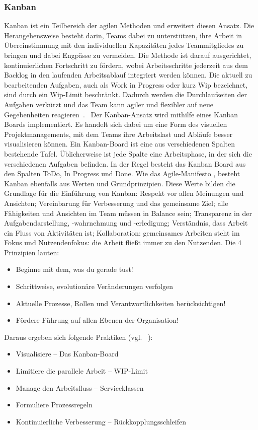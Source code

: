 \documentclass[sigconf, nonacm]{acmart}
\begin{document}
\subsubsection{Kanban}
Kanban ist ein Teilbereich der agilen Methoden und erweitert diesen Ansatz. Die Herangehensweise besteht darin, Teams dabei zu unterstützen, ihre Arbeit in Übereinstimmung mit den individuellen Kapazitäten jedes Teammitgliedes zu bringen und dabei Engpässe zu vermeiden. Die Methode ist darauf ausgerichtet, kontinuierlichen Fortschritt zu fördern, wobei Arbeitsschritte jederzeit aus dem Backlog in den laufenden Arbeitsablauf integriert werden können.
Die aktuell zu bearbeitenden Aufgaben, auch als Work in Progress oder kurz Wip bezeichnet, sind durch ein Wip-Limit beschränkt. Dadurch werden die Durchlaufseiten der Aufgaben verkürzt und das Team kann agiler und flexibler auf neue Gegebenheiten reagieren~\cite{asana_kanban_13_4_23}.
\
Der Kanban-Ansatz wird mithilfe eines Kanban Boards implementiert. Es handelt sich dabei um eine Form des visuellen Projektmanagements, mit dem Teams ihre Arbeitslast und Abläufe besser visualisieren können. Ein Kanban-Board ist eine aus verschiedenen Spalten bestehende Tafel. Üblicherweise ist jede Spalte eine Arbeitsphase, in der sich die verschiedenen Aufgaben befinden. In der Regel besteht das Kanban Board aus den Spalten ToDo, In Progress und Done.
Wie das Agile-Manifesto \cite{beck2001agile}, besteht Kanban ebenfalls aus Werten und Grundprinzipien.
Diese Werte bilden die Grundlage für die Einführung von Kanban: Respekt vor allen Meinungen und Ansichten; Vereinbarung für Verbesserung und das gemeinsame Ziel; alle Fähigkeiten und Ansichten im Team müssen in Balance sein; Transparenz in der Aufgabendarstellung, -wahrnehmung und -erledigung; Verständnis, dass Arbeit ein Fluss von Aktivitäten ist; Kollaboration: gemeinsames Arbeiten steht im Fokus und Nutzendenfokus: die Arbeit fließt immer zu den Nutzenden.
Die 4 Prinzipien lauten:
\begin{itemize}
    \item  Beginne mit dem, was du gerade tust!
    \item Schrittweise, evolutionäre Veränderungen verfolgen
    \item Aktuelle Prozesse, Rollen und Verantwortlichkeiten berücksichtigen!
    \item Fördere Führung auf allen Ebenen der Organisation!
\end{itemize}
Daraus ergeben sich folgende Praktiken (vgl. ~\cite{noauthor_organisationshandbuch_nodate}):
\begin{itemize}
\item Visualisiere – Das Kanban-Board
\item Limitiere die parallele Arbeit – WIP-Limit
\item Manage den Arbeitsfluss – Serviceklassen
\item Formuliere Prozessregeln
\item Kontinuierliche Verbesserung – Rückkopplungsschleifen
\end{itemize}
\end{document}
